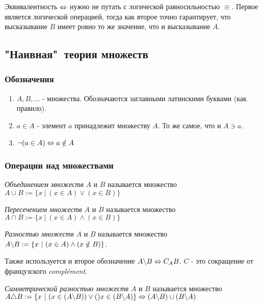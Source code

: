 Эквивалентность $\Leftrightarrow$ нужно не путать с логической равносильностью $\equiv$. Первое является логической операцией, тогда как второе точно гарантирует, что высказывание $B$ имеет ровно то же значение, что и высказывание $A$.


\subsection{"Наивная"\ теория множеств}

\subsubsection*{Обозначения}

\begin{enumerate}
    \item $A, B, \dots$ - множества. Обозначаются заглавными латинскими буквами (как правило).
    \item $a \in A$ - элемент $a$ принадлежит множеству $A$. То же самое, что и $A \ni a$.
    \item $\neg (a \in A) \Leftrightarrow a \notin A$
\end{enumerate}


\subsubsection{Операции над множествами}

\begin{definition}
    \textit{Объединением множеств} $A$ и $B$ называется множество $A \cup B := \{x\ |\ (x \in A) \vee (x \in B)\}$
\end{definition}

\begin{definition}
    \textit{Пересечением множеств} $A$ и $B$ называется множество $A \cap B := \{x\ |\ (x \in A) \wedge (x \in B)\}$
\end{definition}

\begin{definition}
    \textit{Разностью множеств} $A$ и $B$ называется множество $A \backslash B := \{x\ |\ (x \in A) \wedge (x \notin B)\}$.
    
    Также используется и второе обозначение $A \backslash B \Leftrightarrow C_A B$. $C$ - это сокращение от французского \textit{complément}.
\end{definition}

\begin{definition}
    \textit{Симметрической разностью множеств} $A$ и $B$ называется множество $A \triangle B := \{x\ |\ (x \in (A \bs B)) \vee ()x \in (B \bs A)\} \lra (A \bs B) \cup (B \bs A)$
\end{definition}

